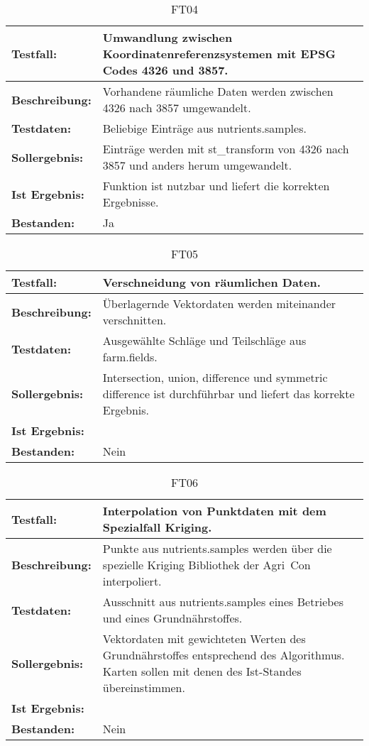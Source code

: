 \begin{table}[h!]
\centering
\small
\begin{tabular}{p{2.8cm}|p{12cm}}
\textbf{Testfall:} & Umwandlung zwischen Koordinatenreferenzsystemen mit EPSG Codes 4326 und 3857. \\ \hline
\textbf{Beschreibung:} & Vorhandene räumliche Daten werden zwischen 4326 nach 3857 umgewandelt. \\ \hline
\textbf{Testdaten:} & Beliebige Einträge aus nutrients.samples. \\ \hline
\textbf{Sollergebnis:} & Einträge werden mit st\_{}transform von 4326 nach 3857 und anders herum umgewandelt. \\ \hline
\textbf{Ist Ergebnis:} & Funktion ist nutzbar und liefert die korrekten Ergebnisse. \\ \hline
\textbf{Bestanden:} & Ja \\
\end{tabular}
\caption*{FT04}
\end{table}

\begin{table}[h!]
\centering
\small
\begin{tabular}{p{2.8cm}|p{12cm}}
\textbf{Testfall:} & Verschneidung von räumlichen Daten. \\ \hline
\textbf{Beschreibung:} & Überlagernde Vektordaten werden miteinander verschnitten. \\ \hline
\textbf{Testdaten:} & Ausgewählte Schläge und Teilschläge aus farm.fields. \\ \hline
\textbf{Sollergebnis:} & Intersection, union, difference und symmetric difference ist durchführbar und liefert das korrekte Ergebnis. \\ \hline
\textbf{Ist Ergebnis:} &  \\ \hline %
\textbf{Bestanden:} & Nein \\
\end{tabular}
\caption*{FT05}
\end{table}

\begin{table}[h!]
\centering
\small
\begin{tabular}{p{2.8cm}|p{12cm}}
\textbf{Testfall:} & Interpolation von Punktdaten mit dem Spezialfall Kriging. \\ \hline
\textbf{Beschreibung:} & Punkte aus nutrients.samples werden über die spezielle Kriging Bibliothek der Agri~Con interpoliert. \\ \hline
\textbf{Testdaten:} & Ausschnitt aus nutrients.samples eines Betriebes und eines Grundnährstoffes. \\ \hline
\textbf{Sollergebnis:} & Vektordaten mit gewichteten Werten des Grundnährstoffes entsprechend des Algorithmus. Karten sollen mit denen des Ist-Standes übereinstimmen. \\ \hline
\textbf{Ist Ergebnis:} &  \\ \hline %
\textbf{Bestanden:} & Nein \\
\end{tabular}
\caption*{FT06}
\end{table}

